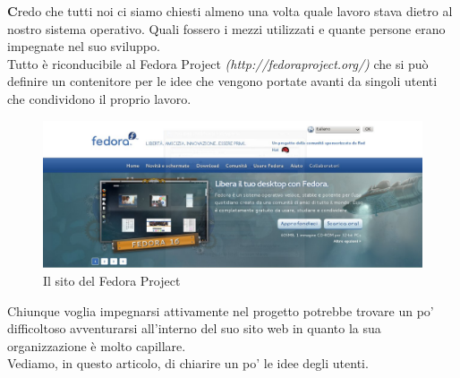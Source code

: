 \lettrine[lines=1, loversize=0.1, lraise=0.1]{\color[cmyk]{0.5, 0, 1, 0}\bfseries C}{}redo che tutti noi ci siamo chiesti almeno una volta quale lavoro stava dietro al nostro sistema operativo. Quali fossero i mezzi utilizzati e quante persone erano impegnate nel suo sviluppo.\\

Tutto è riconducibile al Fedora Project {\itshape (http://fedoraproject.org/)} che si può definire un contenitore per le idee che vengono portate avanti da singoli utenti che condividono il proprio lavoro.\\

\begin{figure}[htbp]
\centering
\includegraphics[scale=.20]{articoli/varie/immagini/fp.jpeg}
\caption{Il sito del Fedora Project\label{Fig.1: Fedora Project}}
\end{figure}

Chiunque voglia impegnarsi attivamente nel progetto potrebbe trovare un po' difficoltoso avventurarsi all'interno del suo sito web in quanto la sua organizzazione è molto capillare.\\

Vediamo, in questo articolo, di chiarire un po' le idee degli utenti.\\

